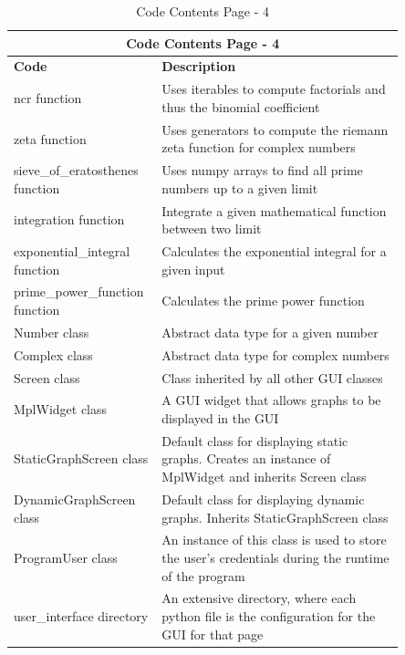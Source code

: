 \documentclass[12pt]{article}
\begin{document}
\begin{table}[ht]
    \centering
    \begin{tabular}{|p{0.26\linewidth}|p{0.59\linewidth}|}
    \hline
    \multicolumn{2}{|c|}{\textbf{Code Contents Page - 4}}\\
    \hline
    \hline
    \textbf{Code} & \textbf{Description}\\
    \hline
    ncr function & Uses iterables to compute factorials and thus the binomial coefficient\\
    \hline
    zeta function & Uses generators to compute the riemann zeta function for complex numbers\\
    \hline
    sieve\_of\_eratosthenes function & Uses numpy arrays to find all prime numbers up to a given limit\\
    \hline
    integration function & Integrate a given mathematical function between two limit\\
    \hline
    exponential\_integral \text{ } function & Calculates the exponential integral for a given input\\
    \hline
    prime\_power\_function function & Calculates the prime power function\\
    \hline
    Number class & Abstract data type for a given number\\
    \hline
    Complex class & Abstract data type for complex numbers\\
    \hline
    Screen class & Class inherited by all other GUI classes\\
    \hline
    MplWidget class & A GUI widget that allows graphs to be displayed in the GUI\\
    \hline
    StaticGraphScreen class & Default class for displaying static graphs. Creates an instance of MplWidget and inherits Screen class\\
    \hline
    DynamicGraphScreen class & Default class for displaying dynamic graphs. Inherits StaticGraphScreen class\\
    \hline
    ProgramUser class & An instance of this class is used to store the user's credentials during the runtime of the program\\
    \hline
    user\_interface directory & An extensive directory, where each python file is the configuration for the GUI for that page\\
    \hline
    \end{tabular}
    \caption{Code Contents Page - 4}
\end{table}
\end{document}
